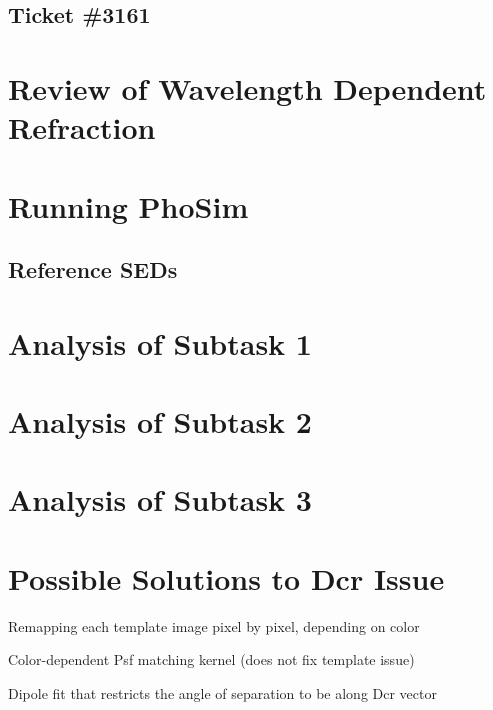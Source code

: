 \documentclass[prd, nofootinbib, floatfix, 11pt, tightenlines, times]{article}
\begin{document}
\subsection{Ticket \#3161}



\section{Review of Wavelength Dependent Refraction \label{sec:theory}}

\section{Running PhoSim}

\subsection{Reference SEDs \label{sec:seds}}

\section{Analysis of Subtask 1 \label{sec:task1}}

\section{Analysis of Subtask 2}

\section{Analysis of Subtask 3}

\section{Possible Solutions to Dcr Issue}

Remapping each template image pixel by pixel, depending on color

Color-dependent Psf matching kernel (does not fix template issue)

Dipole fit that restricts the angle of separation to be along Dcr vector

\end{document}
